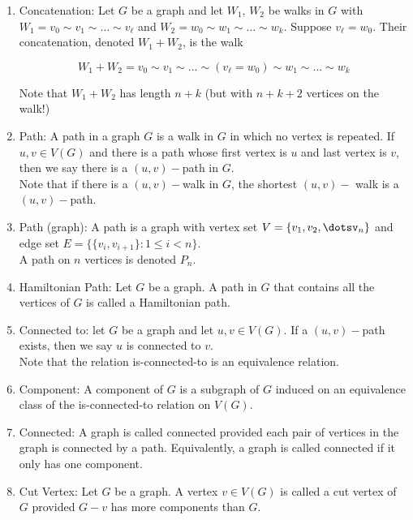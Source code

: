 \documentclass{article}
\begin{document}
\begin{enumerate}
		\item Concatenation: Let $G$ be a graph and let $W_1$, $W_2$ be walks in $G$ with $W_1=v_0\sim v_1\sim \dots\sim v_\ell$ and $W_2=w_0\sim w_1\sim \dots\sim w_k$.
		Suppose $v_\ell=w_0$.
		Their concatenation, denoted $W_1+W_2$, is the walk
		
		\[W_1+W_2=v_0\sim v_1\sim\dots\sim(v_\ell=w_0)\sim w_1\sim\dots\sim w_k\]
		
		Note that $W_1+W_2$ has length $n+k$ (but with $n+k+2$ vertices on the walk!)
		
		\item Path: A path in a graph $G$ is a walk in $G$ in which no vertex is repeated.
		If $u,v\in V(G)$ and there is a path whose first vertex is $u$ and last vertex is $v$, then we say there is a $(u,v)-$path in $G$. \\
		
		Note that if there is a $(u,v)-$walk in $G$, the shortest $(u,v)-$ walk is a $(u,v)-$path.
		
		\item Path (graph): A path is a graph with vertex set $V=\{v_1,v_2,\dotsv_n\}$ and edge set $E=\{\{v_i,v_{i+1}\}:1\leq i<n\}$.\\
		
		A path on $n$ vertices is denoted $P_n$.
		
		\item Hamiltonian Path: Let $G$ be a graph.
		A path in $G$ that contains all the vertices of $G$ is called a Hamiltonian path.
		
		\item Connected to: let $G$ be a graph and let $u,v\in V(G)$.
		If a $(u,v)-$path exists, then we say $u$ is connected to $v$.\\
		
		Note that the relation is-connected-to is an equivalence relation.
		
		\item Component: A component of $G$ is a subgraph of $G$ induced on an equivalence class of the is-connected-to relation on $V(G)$.
		
		\item Connected: A graph is called connected provided each pair of vertices in the graph is connected by a path.
		Equivalently, a graph is called connected if it only has one component.
		
		\item Cut Vertex: Let $G$ be a graph.
		A vertex $v\in V(G)$ is called a cut vertex of $G$ provided $G-v$ has more components than $G$.
		

\end{enumerate}
\end{document}
